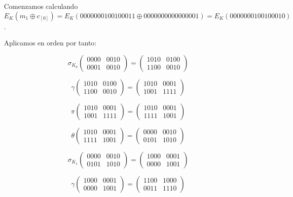 \documentclass[a4paper]{article}
\begin{document}
Comenzamos calculando $E_K (m_1 \oplus c_{[0]} ) = E_K ( 0000 0001 0010 0011 \oplus 0000 0000 0000 0001) = E_K(0000 0001 0010 0010)$.

Aplicamos en orden por tanto:

$$\sigma_{K_0} \begin{pmatrix} 0000 & 0010 \\ 0001 & 0010 \end{pmatrix} = \begin{pmatrix} 1010 & 0100 \\ 1100 & 0010 \end{pmatrix}$$

$$\gamma \begin{pmatrix} 1010 & 0100 \\ 1100 & 0010 \end{pmatrix} = \begin{pmatrix} 1010 & 0001 \\ 1001 & 1111 \end{pmatrix}$$

$$\pi \begin{pmatrix} 1010 & 0001 \\ 1001 & 1111 \end{pmatrix} = \begin{pmatrix} 1010 & 0001 \\ 1111 & 1001 \end{pmatrix}$$

$$\theta \begin{pmatrix} 1010 & 0001 \\ 1111 & 1001 \end{pmatrix} = \begin{pmatrix} 0000 & 0010 \\ 0101 & 1010 \end{pmatrix}$$

$$\sigma_{K_1} \begin{pmatrix} 0000 & 0010 \\ 0101 & 1010 \end{pmatrix} = \begin{pmatrix} 1000 & 0001 \\ 0000 & 1001 \end{pmatrix}$$

$$\gamma \begin{pmatrix} 1000 & 0001 \\ 0000 & 1001 \end{pmatrix} = \begin{pmatrix} 1100 & 1000 \\ 0011 & 1110 \end{pmatrix}$$
\end{document}
